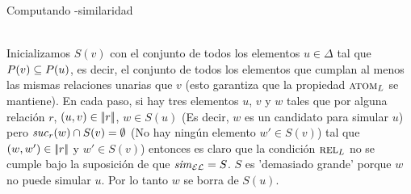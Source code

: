 


\begin{algorithm}
\small
\caption{ Computando \EL-similaridad\label{alg:schematic-gen-sim}}
 \BlankLine


\end{algorithm}



%

\\
Inicializamos $S(v)$ con
el conjunto de todos los elementos $u\in\Delta$ tal que $P(v)\subseteq
P(u)$, es decir, el conjunto de todos los elementos que cumplan al menos las
mismas relaciones unarias que $v$ (esto garantiza que la propiedad $\textsc{atom}_L$ se mantiene).
En cada paso, si hay tres elementos $u$, $v$ y $w$ tales que
por alguna relaci\'on $r$, $(u,v) \in |\!|r|\!|$, $w\in S(u)$
(Es decir, $w$ es un candidato para simular $u$) pero ${\it suc}_{r}(w)\cap S(v) = \emptyset$
(No hay ning\'un elemento $w'\in S(v)$) tal que $(w, w') \in |\!|r|\!|$
y $w'\in S(v)$) entonces es claro que la condici\'on $\textsc{rel}_L$ no se cumple
bajo la suposici\'on de que ${\it sim}_\mathcal{EL}=S$. $S$ es 'demasiado grande' porque
$w$ no puede simular $u$. Por lo tanto $w$ se borra de $S(u)$.


